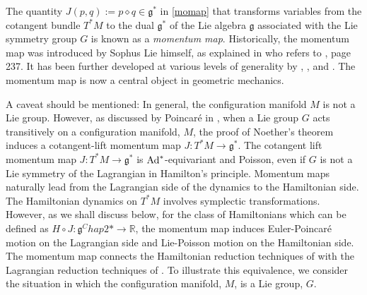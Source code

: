 \documentclass[11pt, oneside]{article}   	%
\numberwithin{equation}{section}
\theoremstyle{plain}
\theoremstyle{definition}
\theoremstyle{remark}
\newcommand{\<}{\langle}
\renewcommand{\>}{\rangle}
\begin{document}
The quantity $J(p,q):=p\diamond q \in \mathfrak{g}^*$ in \eqref{momap} that transforms variables from the cotangent bundle $T^*M$ to the dual $\mathfrak{g}^*$ of the Lie algebra $\mathfrak{g}$ associated with the Lie symmetry group $G$ is known as a \emph{momentum map}. Historically, the momentum map was introduced by Sophus Lie himself, as explained in \cite{weinstein1983sophus} who refers to \cite{lie1890theorie}, page 237. It has been further developed at various levels of generality by \cite{kirillov1962unitary}, \cite{kostant1970quantization}, \cite{souriau1970structure} and \cite{smale1970topologya, smale1970topologyb}. The momentum map is now a central object in geometric mechanics.  

A caveat should be mentioned: In general, the configuration manifold $M$ is not a Lie group. However, as discussed by Poincar\'e in  \cite{poincare1901forme}, when a Lie group $G$ acts transitively on a configuration manifold, $M$, the proof of Noether's theorem induces a cotangent-lift momentum map $J: T^*M\to\mathfrak{g}^*$. 
The cotangent lift momentum map $J: T^*M\to\mathfrak{g}^*$ is ${\rm Ad}^*$-equivariant and Poisson, even if $G$ is not a Lie symmetry of the Lagrangian in Hamilton's principle. Momentum maps naturally lead from the Lagrangian side of the dynamics to the Hamiltonian side. The Hamiltonian dynamics on $T^*M$ involves symplectic transformations. However, as we shall discuss below, for the class of Hamiltonians which can be defined as $H\circ J: \mathfrak{g}^Chap2*\to \mathbb{R}$, the momentum map induces Euler-Poincar\'e motion on the Lagrangian side and Lie-Poisson motion on the Hamiltonian side. The momentum map connects the Hamiltonian reduction techniques of  \cite{marsden1974reduction} with the Lagrangian reduction techniques of \cite{holm1998euler}. To illustrate this equivalence, we consider the situation in which the configuration manifold, $M$, is a Lie group, $G$.
\end{document}
